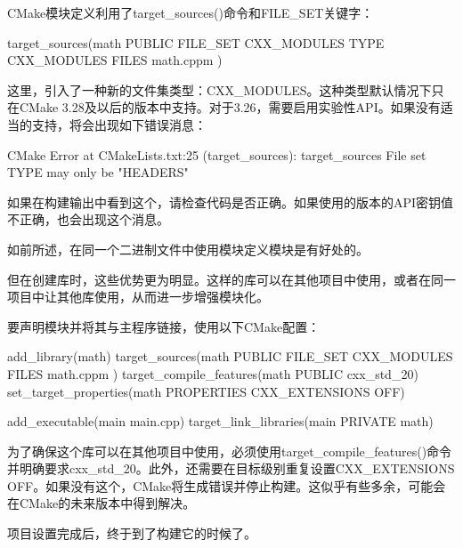 
CMake模块定义利用了target\_sources()命令和FILE\_SET关键字：

\begin{cmake}
target_sources(math
    PUBLIC FILE_SET CXX_MODULES TYPE CXX_MODULES FILES math.cppm
)
\end{cmake}

这里，引入了一种新的文件集类型：CXX\_MODULES。这种类型默认情况下只在CMake 3.28及以后的版本中支持。对于3.26，需要启用实验性API。如果没有适当的支持，将会出现如下错误消息：

\begin{shell}
CMake Error at CMakeLists.txt:25 (target_sources):
target_sources File set TYPE may only be "HEADERS"
\end{shell}

如果在构建输出中看到这个，请检查代码是否正确。如果使用的版本的API密钥值不正确，也会出现这个消息。

如前所述，在同一个二进制文件中使用模块定义模块是有好处的。

但在创建库时，这些优势更为明显。这样的库可以在其他项目中使用，或者在同一项目中让其他库使用，从而进一步增强模块化。

要声明模块并将其与主程序链接，使用以下CMake配置：


\begin{cmake}
add_library(math)
target_sources(math
    PUBLIC FILE_SET CXX_MODULES FILES math.cppm
)
target_compile_features(math PUBLIC cxx_std_20)
set_target_properties(math PROPERTIES CXX_EXTENSIONS OFF)

add_executable(main main.cpp)
target_link_libraries(main PRIVATE math)
\end{cmake}

为了确保这个库可以在其他项目中使用，必须使用target\_compile\_features()命令并明确要求cxx\_std\_20。此外，还需要在目标级别重复设置CXX\_EXTENSIONS OFF。如果没有这个，CMake将生成错误并停止构建。这似乎有些多余，可能会在CMake的未来版本中得到解决。

项目设置完成后，终于到了构建它的时候了。
